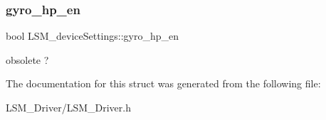 \subsubsection{\texorpdfstring{gyro\+\_\+hp\+\_\+en}{gyro\_hp\_en}}
{\footnotesize\ttfamily bool L\+S\+M\+\_\+device\+Settings\+::gyro\+\_\+hp\+\_\+en}

obsolete ? 

The documentation for this struct was generated from the following file\+:\begin{DoxyCompactItemize}
\item 
L\+S\+M\+\_\+\+Driver/L\+S\+M\+\_\+\+Driver.\+h\end{DoxyCompactItemize}
